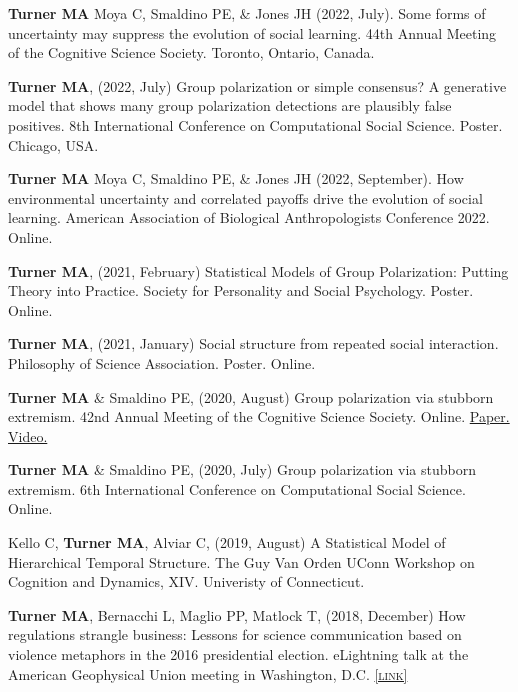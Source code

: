 \documentclass[11pt, letterpaper]{article}
\newcommand{\lurl}[1]{\href{#1}{\scriptsize\textsc{[link]}}}
\begin{document}
    \textbf{Turner MA} Moya C, Smaldino PE, \& Jones JH (2022, July). Some forms of
    uncertainty may suppress the evolution of social learning. 44th Annual Meeting of the
    Cognitive Science Society. Toronto, Ontario, Canada. 

    \textbf{Turner MA}, (2022, July) Group polarization or simple consensus?
    A generative model that shows many group polarization detections are
    plausibly false positives. 8th International Conference on Computational
    Social Science. Poster. Chicago, USA.

 \textbf{Turner MA} Moya C, Smaldino PE, \& Jones JH (2022, September). How
 environmental uncertainty and correlated payoffs drive the evolution of social
 learning. American Association of Biological Anthropologists Conference 2022.
 Online.

    \textbf{Turner MA}, (2021, February) Statistical Models of Group Polarization: Putting Theory into Practice. Society for Personality and Social Psychology. Poster. Online.

    \textbf{Turner MA}, (2021, January) Social structure from repeated social interaction. Philosophy of Science Association. Poster. Online.

    \textbf{Turner MA} \& Smaldino PE, (2020, August) Group polarization via stubborn extremism. 42nd Annual Meeting of the Cognitive Science Society. Online. \href{https://www.researchgate.net/publication/342153646_Stubborn_extremism_as_a_potential_pathway_to_group_polarization}{Paper.} \href{https://youtu.be/i5PHjwu1p40}{Video.}

   \textbf{Turner MA} \& Smaldino PE, (2020, July) Group polarization via stubborn extremism. 6th International Conference on Computational Social Science. Online.

Kello C, \textbf{Turner MA}, Alviar C, (2019, August) A Statistical Model of
Hierarchical Temporal Structure. The Guy Van Orden UConn Workshop on Cognition
and Dynamics, XIV. Univeristy of Connecticut.

\textbf{Turner MA}, Bernacchi L, Maglio PP, Matlock T, (2018, December) How regulations
strangle business: Lessons for science communication based on violence metaphors in the 2016
presidential election. eLightning talk at the American Geophysical Union meeting in Washington,
D.C. \lurl{https://agu.confex.com/agu/fm18/meetingapp.cgi/Paper/451955}
\end{document}
